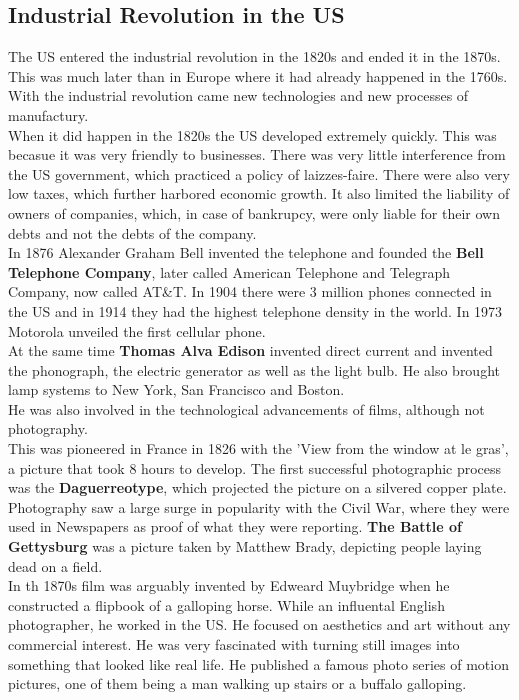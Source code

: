 \documentclass{article}
\begin{document}
	\subsection{Industrial Revolution in the US}
	The US entered the industrial revolution in the 1820s and ended it in the 1870s. This was much later than in Europe where it had already happened in the 1760s. With the industrial revolution came new technologies and new processes of manufactury. \\
	When it did happen in the 1820s the US developed extremely quickly. This was becasue it was very friendly to businesses. There was very little interference from the US government, which practiced a policy of laizzes-faire. There were also very low taxes, which further harbored economic growth. It also limited the liability of owners of companies, which, in case of bankrupcy, were only liable for their own debts and not the debts of the company. \\
	In 1876 Alexander Graham Bell invented the telephone and founded the \textbf{Bell Telephone Company}, later called American Telephone and Telegraph Company, now called AT\&T. In 1904 there were 3 million phones connected in the US and in 1914 they had the highest telephone density in the world. In 1973 Motorola unveiled the first cellular phone. \\
	At the same time \textbf{Thomas Alva Edison} invented direct current and invented the phonograph, the electric generator as well as the light bulb. He also brought lamp systems to New York, San Francisco and Boston. \\
	He was also involved in the technological advancements of films, although not photography. \\
	This was pioneered in France in 1826 with the 'View from the window at le gras', a picture that took 8 hours to develop. The first successful photographic process was the \textbf{Daguerreotype}, which projected the picture on a silvered copper plate. \\
	Photography saw a large surge in popularity with the Civil War, where they were used in Newspapers as proof of what they were reporting. \textbf{The Battle of Gettysburg} was a picture taken by Matthew Brady, depicting people laying dead on a field. \\
	In th 1870s film was arguably invented by Edweard Muybridge when he constructed a flipbook of a galloping horse. While an influental English photographer, he worked in the US. He focused on aesthetics and art without any commercial interest. He was very fascinated with turning still images into something that looked like real life. He published a famous photo series of motion pictures, one of them being a man walking up stairs or a buffalo galloping. \\
\end{document}
